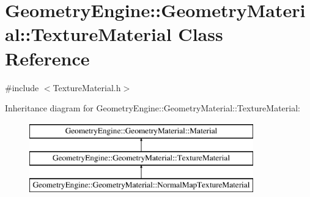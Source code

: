 \hypertarget{class_geometry_engine_1_1_geometry_material_1_1_texture_material}{}\section{Geometry\+Engine\+::Geometry\+Material\+::Texture\+Material Class Reference}
\label{class_geometry_engine_1_1_geometry_material_1_1_texture_material}


{\ttfamily \#include $<$Texture\+Material.\+h$>$}

Inheritance diagram for Geometry\+Engine\+::Geometry\+Material\+::Texture\+Material\+:\begin{figure}[H]
\begin{center}
\leavevmode
\includegraphics[height=3.000000cm]{class_geometry_engine_1_1_geometry_material_1_1_texture_material}
\end{center}
\end{figure}
